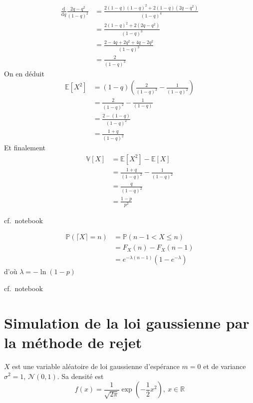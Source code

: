 \begin{align*}
\frac{\mathrm{d}}{\mathrm{d} q}\frac{2q-q^2}{(1-q)^2}&=\frac{2(1-q)(1-q)^2+2(1-q)(2q-q^2)}{(1-q)^4}\\
&= \frac{2(1-q)^2+2(2q-q^2)}{(1-q)^3}\\
&= \frac{2 - 4q +2q^2 + 4q -2q^2}{(1-q)^3}\\
&= \frac{2}{(1-q)^3}
\end{align*} On en déduit \begin{align*}
\mathbb{E}[X^2]&=(1-q)\left(\frac{2}{(1-q)^3}-\frac{1}{(1-q)^2}\right)\\
&=\frac{2}{(1-q)^2}-\frac{1}{(1-q)}\\
&=\frac{2-(1-q)}{(1-q)^2}\\
&=\frac{1+q}{(1-q)^2}
\end{align*} Et finalement \begin{align*}
\mathbb{V}[X] &= \mathbb{E}[X^2]-\mathbb{E}[X]\\
&= \frac{1+q}{(1-q)^2}-\frac{1}{(1-q)^2}\\
&=\frac{q}{(1-q)^2}\\
&=\frac{1-p}{p^2}
\end{align*}

\label{V-answer-loigeom2}
cf.~notebook

\label{V-answer-loigeom3}

\begin{align*}
\mathbb{P}(\lceil X \rceil = n) & = \mathbb{P}(n-1 < X \leq n) \\
& = F_X(n) - F_X(n-1) \\
& = e^{-\lambda (n-1)}(1-e^{-\lambda})
\end{align*} d'où \(\lambda = -\ln(1-p)\)

\label{V-answer-loigeom4}
cf.~notebook

\section{Simulation de la loi gaussienne par la méthode de
rejet}\label{V-simulation-de-la-loi-gaussienne-par-la-muxe9thode-de-rejet-1}

\(X\) est une variable aléatoire de loi gaussienne d'espérance \(m=0\)
et de variance \(\sigma^2=1\), \(\mathcal{N}(0,1)\). Sa densité est
\[f(x) = \frac{1}{\sqrt{2\pi}}\exp\left(-\frac{1}{2}x^2\right),~x\in \mathbb{R}\]


